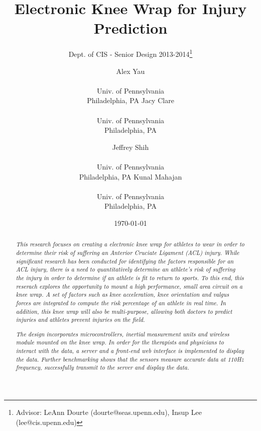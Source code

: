 \documentclass{sig-alternate}
\begin{document}
\nocite{*}
\title{Electronic Knee Wrap for Injury Prediction}
\subtitle{Dept. of CIS - Senior Design 2013-2014\thanks{Advisor: LeAnn Dourte (dourte@seas.upenn.edu), Insup Lee (lee@cis.upenn.edu)}}
\author{
\alignauthor Alex Yau \\  \\ Univ. of Pennsylvania \\ Philadelphia, PA
\alignauthor Jacy Clare \\  \\ Univ. of Pennsylvania \\ Philadelphia, PA
\and
\alignauthor Jeffrey Shih \\  \\ Univ. of Pennsylvania \\ Philadelphia, PA
\alignauthor Kunal Mahajan \\  \\ Univ. of Pennsylvania \\ Philadelphia, PA}
\date{\today}
\maketitle

\begin{abstract}

  \textit{This research focuses on creating a electronic knee wrap for athletes to wear in order to determine their risk of suffering an Anterior Cruciate Ligament (ACL) injury. While significant research has been conducted for identifying the factors responsible for an ACL injury, there is a need to quantitatively determine an athlete's risk of suffering the injury in order to determine if an athlete is fit to return to sports. To this end, this reserach explores the opportunity to mount a high performance, small area circuit on a knee wrap. A set of factors such as knee acceleration, knee orientation and valgus forces are integrated to compute the risk percentage of an athlete in real time. In addition, this knee wrap will also be multi-purpose, allowing both doctors to predict injuries and athletes prevent injuries on the field.}

  \textit{The design incorporates microcontrollers, inertial measurement units and wireless module mounted on the knee wrap. In order for the therapists and physicians to interact with the data, a server and a front-end web interface is implemented to display the data. Further benchmarking shows that the sensors measure accurate data at 110Hz frequency, successfully transmit to the server and display the data.}

\end{abstract}
\end{document}
